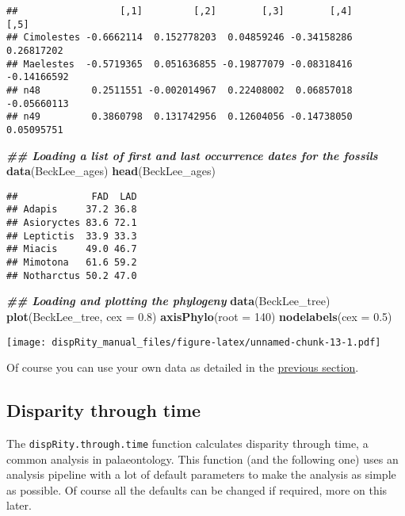 \documentclass[
]{book}
\newenvironment{Shaded}{\begin{snugshade}}{\end{snugshade}}
\newcommand{\AttributeTok}[1]{\textcolor[rgb]{0.13,0.29,0.53}{#1}}
\newcommand{\DecValTok}[1]{\textcolor[rgb]{0.00,0.00,0.81}{#1}}
\newcommand{\DocumentationTok}[1]{\textcolor[rgb]{0.56,0.35,0.01}{\textbf{\textit{#1}}}}
\newcommand{\FloatTok}[1]{\textcolor[rgb]{0.00,0.00,0.81}{#1}}
\newcommand{\FunctionTok}[1]{\textcolor[rgb]{0.13,0.29,0.53}{\textbf{#1}}}
\newcommand{\NormalTok}[1]{#1}
\begin{document}
\begin{verbatim}
##                  [,1]         [,2]        [,3]        [,4]        [,5]
## Cimolestes -0.6662114  0.152778203  0.04859246 -0.34158286  0.26817202
## Maelestes  -0.5719365  0.051636855 -0.19877079 -0.08318416 -0.14166592
## n48         0.2511551 -0.002014967  0.22408002  0.06857018 -0.05660113
## n49         0.3860798  0.131742956  0.12604056 -0.14738050  0.05095751
\end{verbatim}

\begin{Shaded}
\begin{Highlighting}[]
\DocumentationTok{\#\# Loading a list of first and last occurrence dates for the fossils}
\FunctionTok{data}\NormalTok{(BeckLee\_ages)}
\FunctionTok{head}\NormalTok{(BeckLee\_ages)}
\end{Highlighting}
\end{Shaded}

\begin{verbatim}
##             FAD  LAD
## Adapis     37.2 36.8
## Asioryctes 83.6 72.1
## Leptictis  33.9 33.3
## Miacis     49.0 46.7
## Mimotona   61.6 59.2
## Notharctus 50.2 47.0
\end{verbatim}

\begin{Shaded}
\begin{Highlighting}[]
\DocumentationTok{\#\# Loading and plotting the phylogeny}
\FunctionTok{data}\NormalTok{(BeckLee\_tree)}
\FunctionTok{plot}\NormalTok{(BeckLee\_tree, }\AttributeTok{cex =} \FloatTok{0.8}\NormalTok{) }
\FunctionTok{axisPhylo}\NormalTok{(}\AttributeTok{root =} \DecValTok{140}\NormalTok{)}
\FunctionTok{nodelabels}\NormalTok{(}\AttributeTok{cex =} \FloatTok{0.5}\NormalTok{)}
\end{Highlighting}
\end{Shaded}

\texttt{[image: dispRity\_manual\_files/figure-latex/unnamed-chunk-13-1.pdf]}

Of course you can use your own data as detailed in the \protect\hyperlink{What-sort-of-data-does-dispRity-work-with}{previous section}.

\hypertarget{disparity-through-time}{%
\subsection{Disparity through time}\label{disparity-through-time}}

The \texttt{dispRity.through.time} function calculates disparity through time, a common analysis in palaeontology.
This function (and the following one) uses an analysis pipeline with a lot of default parameters to make the analysis as simple as possible.
Of course all the defaults can be changed if required, more on this later.
\end{document}
